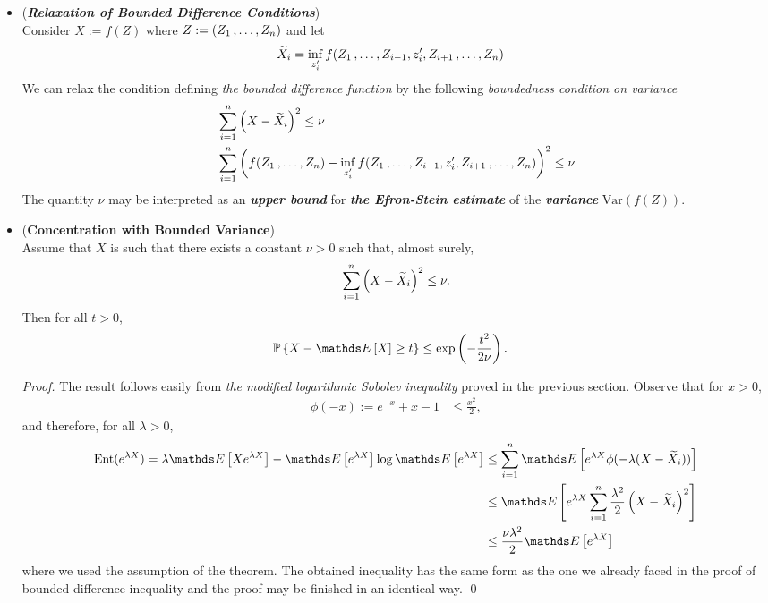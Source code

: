 \documentclass[11pt]{article}
\begin{document}
\begin{itemize}
\item \begin{remark} (\textbf{\emph{Relaxation of Bounded Difference Conditions}})\\
Consider $X := f(Z)$ where $Z:= (Z_1 \,{,}\ldots{,}\, Z_{n})$ and let 
\begin{align*}
\widetilde{X}_{i} &= \inf_{z_i'} f(Z_1 \,{,}\ldots{,}\, Z_{i-1}, z_{i}', Z_{i+1} \,{,}\ldots{,}\, Z_n)
\end{align*} We can relax the condition defining \emph{the bounded difference function} by the following \emph{boundedness condition on variance}
\begin{align}
&\sum_{i=1}^{n}\left(X - \widetilde{X}_{i}\right)^2 \le \nu  \nonumber\\
&\sum_{i=1}^{n}\left(f(Z_1 \,{,}\ldots{,}\, Z_{n}) - \inf_{z_i'} f(Z_1 \,{,}\ldots{,}\, Z_{i-1}, z_{i}', Z_{i+1} \,{,}\ldots{,}\, Z_n) \right)^2 \le \nu  \label{ineqn: bounded_variance_condition}
\end{align} The quantity $\nu$ may be interpreted as an \emph{\textbf{upper bound}} for \emph{\textbf{the Efron-Stein estimate}} of the \emph{\textbf{variance}} $\text{Var}(f(Z))$. 
\end{remark}

\item \begin{proposition} \label{prop: bounded_variance_concentration} (\textbf{Concentration with Bounded Variance})\citep{boucheron2013concentration}\\
Assume that $X$ is such that there exists a constant $\nu > 0$ such that, almost surely,
\begin{align*}
\sum_{i=1}^{n}\left(X - \widetilde{X}_{i}\right)^2 \le \nu.
\end{align*} Then for all $t > 0$,
\begin{align}
\bP\set{X - \E{}{X} \ge t } &\le   \exp\paren{- \frac{t^2}{2 \nu}}. 
\end{align}
\end{proposition}
\begin{proof}
The result follows easily from \emph{the modified logarithmic Sobolev inequality} proved in the previous section. Observe that for $x > 0$, 
\begin{align*}
\phi(-x) :=e^{-x} + x -1 &\le \frac{x^2}{2},
\end{align*}
 and therefore, for all $\lambda > 0$, 
 \begin{align*}
\text{Ent}(e^{\lambda X})  =  \lambda \E{}{Xe^{\lambda X}} - \E{}{e^{\lambda X}}\log\E{}{e^{\lambda X}} &\le \sum_{i=1}^{n}\E{}{e^{\lambda X}\phi(-\lambda(X - \widetilde{X}_{i}))}\\
 &\le \E{}{e^{\lambda X} \sum_{i=1}^{n}\frac{\lambda^2}{2} \paren{X - \widetilde{X}_{i}}^2}\\
 &\le \frac{\nu \lambda^2}{2} \E{}{e^{\lambda X} }
 \end{align*} where we used the assumption of the theorem. The obtained inequality has the same form as the one we already faced in the proof of bounded difference inequality and the proof may be finished in an identical way. \qed
\end{proof}
\end{itemize}
\end{document}
